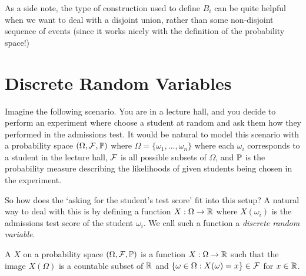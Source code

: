 \documentclass[a4paper]{scrartcl}
\begin{document}
As a side note, the type of construction used to define $B_i$ can be quite helpful when we want to deal with a disjoint union, rather than some non-disjoint sequence of events (since it works nicely with the definition of the probability space!)




\section{Discrete Random Variables}

Imagine the following scenario. You are in a lecture hall, and you decide to perform an experiment where choose a student at random and ask them how they performed in the admissions test. It would be natural to model this scenario with a probability space $(\Omega, \mathcal{F}, \mathbb{P})$ where $\Omega = \{\omega_1, \dots, \omega_n\}$ where each $\omega_i$ corresponds to a student in the lecture hall, $\mathcal{F}$ is all possible subsets of $\Omega$, and $\mathbb{P}$ is the probability measure describing the likelihoods of given students being chosen in the experiment.

So how does the `asking for the student's test score' fit into this setup? A natural way to deal with this is by defining a function $X : \Omega \rightarrow \mathbb{R}$ where $X(\omega_i)$ is the admissions test score of the student $\omega_i$. We call such a function a \emph{discrete random variable}. 

\begin{definition}
	A  $X$ on a probability space $(\Omega, \mathcal{F}, \mathbb{P})$ is a function $X : \Omega \rightarrow \mathbb{R}$ such that the image $X(\Omega)$ is a countable subset of $\mathbb{R}$ and $\{ \omega \in \Omega : X(\omega) = x \} \in \mathcal{F}$ for $x \in \mathbb{R}$.
\end{definition}
\end{document}

